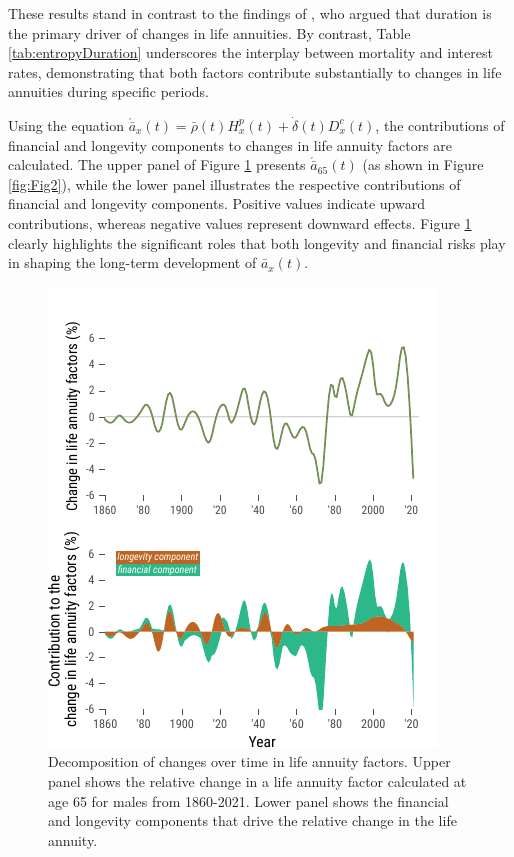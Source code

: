 \documentclass[12pt]{article}
\begin{document}
These results stand in contrast to the findings of \citet{rabitti2020mortality}, who argued that duration is the primary driver of changes in life annuities. By contrast, Table \ref{tab:entropyDuration} underscores the interplay between mortality and interest rates, demonstrating that both factors contribute substantially to changes in life annuities during specific periods.

Using the equation \( \acute{\bar{a}}_x(t) = \bar{\rho}(t) {H}^{p}_x(t) + \dot{\delta}(t) D^{c}_x(t) \), the contributions of financial and longevity components to changes in life annuity factors are calculated. The upper panel of Figure \ref{fig:Fig4} presents \( \acute{\bar{a}}_{65}(t) \) (as shown in Figure \ref{fig:Fig2}), while the lower panel illustrates the respective contributions of financial and longevity components. Positive values indicate upward contributions, whereas negative values represent downward effects. Figure \ref{fig:Fig4} clearly highlights the significant roles that both longevity and financial risks play in shaping the long-term development of \( \bar{a}_x(t) \).


\begin{figure}[H]
	\centering
	\includegraphics[width=0.5\linewidth]{Fig/decompositionLongTermSingleInterestRates}
	\caption{{Decomposition of changes over time in life annuity factors. Upper panel shows the relative change in a life annuity factor calculated at age 65 for males from 1860-2021. Lower panel shows the financial and longevity components that drive the relative change in the life annuity. }}
	\label{fig:Fig4}
\end{figure}
\end{document}
